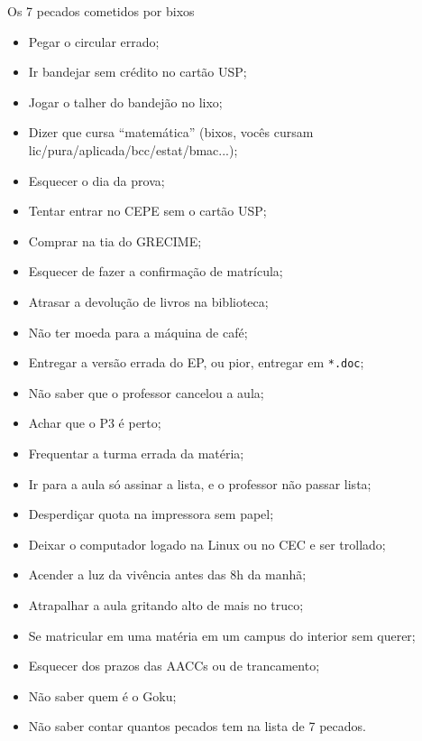 \begin{editorial}{Os 7 pecados cometidos por bixos}

\begin{itemize}
  \item Pegar o circular errado;
  \item Ir bandejar sem crédito no cartão USP;
  \item Jogar o talher do bandejão no lixo;
  \item Dizer que cursa ``matemática'' (bixos, vocês cursam
        lic/pura/aplicada/bcc/estat/bmac...);
  \item Esquecer o dia da prova;
  \item Tentar entrar no CEPE sem o cartão USP;
  \item Comprar na tia do GRECIME;
  \item Esquecer de fazer a confirmação de matrícula;
  \item Atrasar a devolução de livros na biblioteca;
  \item Não ter moeda para a máquina de café;
  \item Entregar a versão errada do EP, ou pior, entregar em \texttt{*.doc};
  \item Não saber que o professor cancelou a aula;
  \item Achar que o P3 é perto;
  \item Frequentar a turma errada da matéria;
  \item Ir para a aula só assinar a lista, e o professor não passar lista;
  \item Desperdiçar quota na impressora sem papel;
  \item Deixar o computador logado na Linux ou no CEC e ser trollado;
  \item Acender a luz da vivência antes das 8h da manhã;
  \item Atrapalhar a aula gritando alto de mais no truco;
  \item Se matricular em uma matéria em um campus do interior sem querer;
  \item Esquecer dos prazos das AACCs ou de trancamento;
  \item Não saber quem é o Goku;
  \item Não saber contar quantos pecados tem na lista de 7 pecados.
\end{itemize}

\end{editorial}
